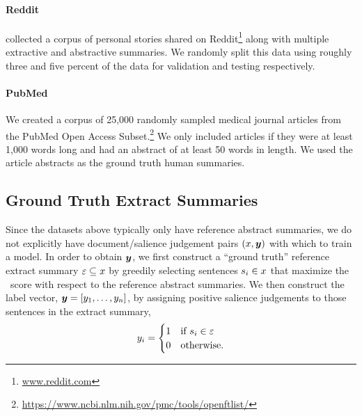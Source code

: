 \paragraph{Reddit} \citet{ouyang2017crowd} collected a corpus of personal
stories shared on Reddit\footnote{\url{www.reddit.com}} along with multiple
extractive and abstractive summaries. We randomly split this data using roughly
three and five percent of the data for validation and testing respectively.

\paragraph{PubMed}{We created a corpus of 25,000 randomly sampled medical
journal articles from the PubMed Open Access
Subset.\footnote{\url{https://www.ncbi.nlm.nih.gov/pmc/tools/openftlist/}} We
only included articles if they were at least 1,000 words long and had an
abstract of at least 50 words in length.  We used the article abstracts as the
ground truth human summaries.}

\subsection{Ground Truth Extract Summaries} \label{sec:labelgen} Since the
datasets above typically only have reference abstract summaries, we do not
explicitly have document/salience judgement pairs $(x, \boldsymbol{y})$ with which
to train a model. In order to obtain $\boldsymbol{y}$, we first construct a ``ground
truth'' reference extract summary $\varepsilon \subseteq x$ by greedily
selecting sentences $s_i \in x$ that maximize the \rouge~score
\citep{lin2004} with respect to the reference abstract summaries.  We then
construct the label vector, $\boldsymbol{y} = \left[y_1,\ldots,y_n
\right]$, by assigning positive salience judgements to those sentences in the
extract summary, 
\[
    y_i = \begin{cases} 
        1  & \textrm{if $s_i \in \varepsilon$} \\ 
        0 & \textrm{otherwise.} \end{cases} 
\]



